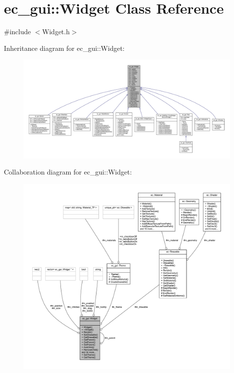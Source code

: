\hypertarget{classec__gui_1_1_widget}{}\section{ec\+\_\+gui\+:\+:Widget Class Reference}
\label{classec__gui_1_1_widget}


{\ttfamily \#include $<$Widget.\+h$>$}



Inheritance diagram for ec\+\_\+gui\+:\+:Widget\+:\nopagebreak
\begin{figure}[H]
\begin{center}
\leavevmode
\includegraphics[width=350pt]{classec__gui_1_1_widget__inherit__graph}
\end{center}
\end{figure}


Collaboration diagram for ec\+\_\+gui\+:\+:Widget\+:
\nopagebreak
\begin{figure}[H]
\begin{center}
\leavevmode
\includegraphics[width=350pt]{classec__gui_1_1_widget__coll__graph}
\end{center}
\end{figure}
